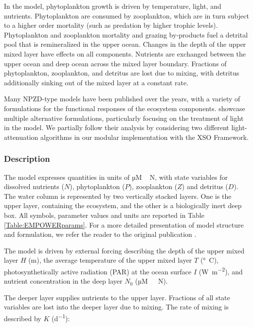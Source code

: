 \documentclass[gmd, manuscript]{copernicus}
\begin{document}
In the model, phytoplankton growth is driven by temperature, light, and nutrients. Phytoplankton are consumed by zooplankton, which are in turn subject to a higher order mortality (such as predation by higher trophic levels). Phytoplankton and zooplankton mortality and grazing by-products fuel a detrital pool that is remineralized in the upper ocean. Changes in the depth of the upper mixed layer have effects on all components. Nutrients are exchanged between the upper ocean and deep ocean across the mixed layer boundary. Fractions of phytoplankton, zooplankton, and detritus are lost due to mixing, with detritus additionally sinking out of the mixed layer at a constant rate.

Many NPZD-type models have been published over the years, with a variety of formulations for the functional responses of the ecosystem components. \citet{Anderson2015c} showcase multiple alternative formulations, particularly focusing on the treatment of light in the model. We partially follow their analysis by considering two different light-attenuation algorithms in our modular implementation with the XSO Framework.

\subsubsection{Description}
The model expresses quantities in units of \unit{µM\,N}, with state variables for dissolved nutrients ($N$), phytoplankton ($P$), zooplankton ($Z$) and detritus ($D$). The water column is represented by two vertically stacked layers. One is the upper layer, containing the ecosystem, and the other is a biologically inert deep box. All symbols, parameter values and units are reported in Table \ref{Table:EMPOWERparams}. For a more detailed presentation of model structure and formulation, we refer the reader to the original publication \citep{Anderson2015c}.

The model is driven by external forcing describing the depth of the upper mixed layer $H$ (\unit{m}), the average temperature of the upper mixed layer $T$ (\unit{\degree C}), photosynthetically active radiation (PAR) at the ocean surface $I$ (\unit{W m^{-2}}), and nutrient concentration in the deep layer $N_0$ (\unit{µM \ N}). 

The deeper layer supplies nutrients to the upper layer. Fractions of all state variables are  lost into the deeper layer due to mixing. The rate of mixing is described by $K$ (\unit{d^{−1}}):
\end{document}
